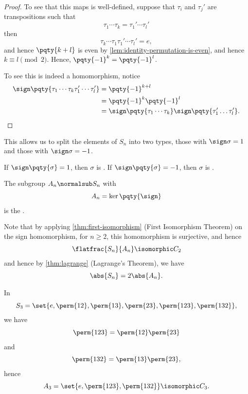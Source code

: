 \begin{proof}
    To see that this maps is well-defined, suppose that \(\tau_i\) and \(\tau_j'\) are transpositions such that
    \[
        \tau_1 \cdots \tau_k = \tau_1' \cdots \tau_l'
    \]
    then
    \[
        \tau_k \cdots \tau_1 \tau_1' \cdots \tau_l' = e,
    \]
    and hence \(\pqty{k + l}\) is even by \autoref{lem:identity-permutation-is-even}, and hence \(k \equiv l \pmod{2}\). Hence, \(\pqty{-1}^k = \pqty{-1}^l\).

    To see this is indeed a homomorphism, notice
    \begin{align*}
        \sign\pqty{\tau_1 \cdots \tau_k \tau_1' \cdots \tau_l'} &= \pqty{-1}^{k + l} \\
        &= \pqty{-1}^k \pqty{-1}^l \\
        &= \sign\pqty{\tau_1 \cdots \tau_k} \sign\pqty{\tau_1' \dots \tau_l'}.
    \end{align*}
\end{proof}

This allows us to split the elements of \(S_n\) into two types, those with \(\sign \sigma = 1\) and those with \(\sign \sigma = -1\).

\begin{definition}
    \label{def:sign-permutation-alternating-group}%
    If \(\sign\pqty{\sigma} = 1\), then \(\sigma\) is . If \(\sign\pqty{\sigma} = -1\), then \(\sigma\) is .

    The subgroup \(A_n \normalsub S_n\) with
    \[
        A_n = \ker\pqty{\sign}
    \]
    is the .
\end{definition}

Note that by applying \autoref{thm:first-isomorphism} (First Isomorphism Theorem) on the sign homomorphism, for \(n \geq 2\), this homomorphism is surjective, and hence
\[
    \flatfrac{S_n}{A_n} \isomorphic C_2
\]
and hence by \autoref{thm:lagrange} (Lagrange's Theorem), we have
\[
    \abs{S_n} = 2 \abs{A_n}.
\]

\begin{example*}[\(S_3\) and \(A_3\)]
    In
    \[
        S_3 = \set{e, \perm{12}, \perm{13}, \perm{23}, \perm{123}, \perm{132}},
    \]
    we have
    \[
        \perm{123} = \perm{12} \perm{23}
    \]
    and
    \[
        \perm{132} = \perm{13} \perm{23},
    \]
    hence
    \[
        A_3 = \set{e, \perm{123}, \perm{132}} \isomorphic C_3.
    \]
\end{example*}

